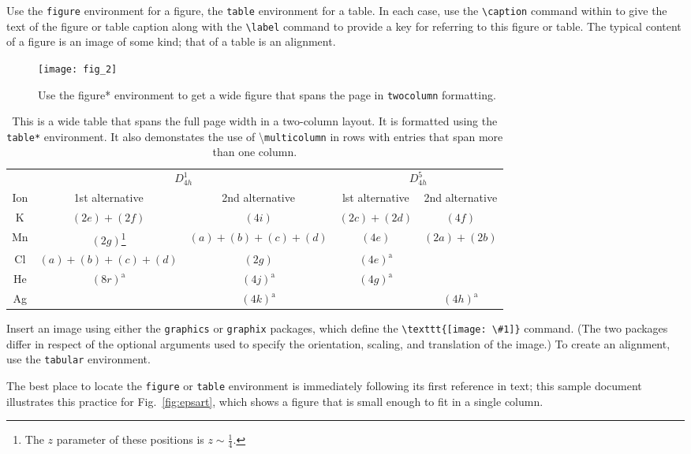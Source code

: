 \documentclass[%
 reprint,
 amsmath,amssymb,
 aps,
]{revtex4-1}
\begin{document}
Use the \texttt{figure} environment for a figure, the \texttt{table} environment for a table.
In each case, use the \verb+\caption+ command within to give the text of the
figure or table caption along with the \verb+\label+ command to provide
a key for referring to this figure or table.
The typical content of a figure is an image of some kind; 
that of a table is an alignment.%
\begin{figure}
\texttt{[image: fig\_2]}%
\caption{\label{fig:wide}Use the figure* environment to get a wide
figure that spans the page in \texttt{twocolumn} formatting.}
\end{figure}
\begin{table}
\caption{\label{tab:table3}This is a wide table that spans the full page
width in a two-column layout. It is formatted using the
\texttt{table*} environment. It also demonstates the use of
\textbackslash\texttt{multicolumn} in rows with entries that span
more than one column.}
\begin{ruledtabular}
\begin{tabular}{ccccc}
 &\multicolumn{2}{c}{$D_{4h}^1$}&\multicolumn{2}{c}{$D_{4h}^5$}\\
 Ion&1st alternative&2nd alternative&lst alternative
&2nd alternative\\ \hline
 K&$(2e)+(2f)$&$(4i)$ &$(2c)+(2d)$&$(4f)$ \\
 Mn&$(2g)$\footnote{The $z$ parameter of these positions is $z\sim\frac{1}{4}$.}
 &$(a)+(b)+(c)+(d)$&$(4e)$&$(2a)+(2b)$\\
 Cl&$(a)+(b)+(c)+(d)$&$(2g)$\footnotemark[1]
 &$(4e)^{\text{a}}$\\
 He&$(8r)^{\text{a}}$&$(4j)^{\text{a}}$&$(4g)^{\text{a}}$\\
 Ag& &$(4k)^{\text{a}}$& &$(4h)^{\text{a}}$\\
\end{tabular}
\end{ruledtabular}
\end{table}

Insert an image using either the \texttt{graphics} or
\texttt{graphix} packages, which define the \verb+\texttt{[image: \#1]}+ command.
(The two packages differ in respect of the optional arguments 
used to specify the orientation, scaling, and translation of the image.) 
To create an alignment, use the \texttt{tabular} environment. 

The best place to locate the \texttt{figure} or \texttt{table} environment
is immediately following its first reference in text; this sample document
illustrates this practice for Fig.~\ref{fig:epsart}, which
shows a figure that is small enough to fit in a single column. 
\end{document}
